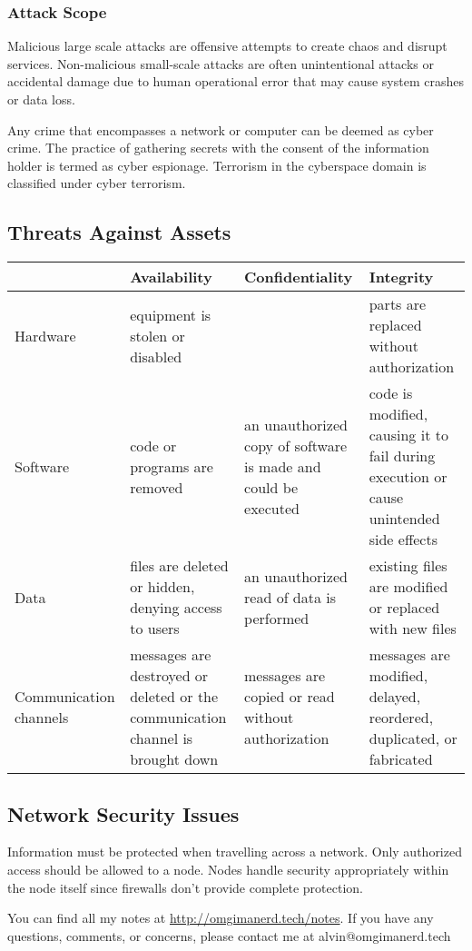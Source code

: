 \documentclass{math}
\begin{document}
\subsubsection*{Attack Scope}
Malicious large scale attacks are offensive attempts to create chaos and disrupt
services. Non-malicious small-scale attacks are often unintentional attacks or
accidental damage due to human operational error that may cause system crashes
or data loss. \par
Any crime that encompasses a network or computer can be deemed as cyber crime.
The practice of gathering secrets with the consent of the information holder is
termed as cyber espionage. Terrorism in the cyberspace domain is classified
under cyber terrorism.

\subsection*{Threats Against Assets}
\begin{center}
  \begin{tabular}{|p{3cm}|p{4cm}|p{4cm}|p{4cm}|}
    \hline
    & Availability & Confidentiality & Integrity \\
    \hline
    Hardware & equipment is stolen or disabled & & parts are replaced without
      authorization \\
    \hline
    Software & code or programs are removed & an unauthorized copy of software
      is made and could be executed & code is modified, causing it to fail
      during execution or cause unintended side effects \\
    \hline
    Data & files are deleted or hidden, denying access to users & an
      unauthorized read of data is performed & existing files are modified or
      replaced with new files \\
    \hline
    Communication channels & messages are destroyed or deleted or the
      communication channel is brought down & messages are copied or read
      without authorization & messages are modified, delayed, reordered,
      duplicated, or fabricated \\
    \hline
  \end{tabular}
\end{center}

\subsection*{Network Security Issues}
Information must be protected when travelling across a network. Only
authorized access should be allowed to a node. Nodes handle security
appropriately within the node itself since firewalls don't provide complete
protection.

\begin{center}
  You can find all my notes at \url{http://omgimanerd.tech/notes}. If you have
  any questions, comments, or concerns, please contact me at
  alvin@omgimanerd.tech
\end{center}
\end{document}
